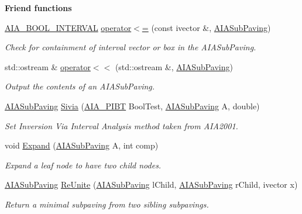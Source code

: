 \begin{Indent}{\bf \-Friend functions}
\begin{DoxyCompactItemize}
\hyperlink{AIAsubpaving_8hpp_a04a5da87f7c1570d6ef4843fb476d1a6}{\-A\-I\-A\-\_\-\-B\-O\-O\-L\-\_\-\-I\-N\-T\-E\-R\-V\-A\-L} \hyperlink{classAIASPnode_a0869804e6aaefcc26aebe081061df6ad}{operator$<$=} (const ivector \&, \hyperlink{AIAsubpaving_8hpp_ab6618d8727b32e897c1b7ab3415b93ff}{\-A\-I\-A\-Sub\-Paving})
\begin{DoxyCompactList}\small\item\em \-Check for containment of interval vector or box in the \-A\-I\-A\-Sub\-Paving. \end{DoxyCompactList}\item 
std\-::ostream \& \hyperlink{classAIASPnode_abf9101628f2ef58fbd1132a1c7086d06}{operator$<$$<$} (std\-::ostream \&, \hyperlink{AIAsubpaving_8hpp_ab6618d8727b32e897c1b7ab3415b93ff}{\-A\-I\-A\-Sub\-Paving})
\begin{DoxyCompactList}\small\item\em \-Output the contents of an \-A\-I\-A\-Sub\-Paving. \end{DoxyCompactList}\item 
\hyperlink{AIAsubpaving_8hpp_ab6618d8727b32e897c1b7ab3415b93ff}{\-A\-I\-A\-Sub\-Paving} \hyperlink{classAIASPnode_a7ca818aa239136500bfc1020684160de}{\-Sivia} (\hyperlink{AIAsubpaving_8hpp_ac3a2af016d66120f37b7e4b3da564876}{\-A\-I\-A\-\_\-\-P\-I\-B\-T} \-Bool\-Test, \hyperlink{AIAsubpaving_8hpp_ab6618d8727b32e897c1b7ab3415b93ff}{\-A\-I\-A\-Sub\-Paving} \-A, double)
\begin{DoxyCompactList}\small\item\em \-Set \-Inversion \-Via \-Interval \-Analysis method taken from \-A\-I\-A2001. \end{DoxyCompactList}\item 
void \hyperlink{classAIASPnode_aa3ceca06b6916b5ac1382a5aa8bf56aa}{\-Expand} (\hyperlink{AIAsubpaving_8hpp_ab6618d8727b32e897c1b7ab3415b93ff}{\-A\-I\-A\-Sub\-Paving} \-A, int comp)
\begin{DoxyCompactList}\small\item\em \-Expand a leaf node to have two child nodes. \end{DoxyCompactList}\item 
\hyperlink{AIAsubpaving_8hpp_ab6618d8727b32e897c1b7ab3415b93ff}{\-A\-I\-A\-Sub\-Paving} \hyperlink{classAIASPnode_ad0b3998c79d0cbf91d21c550a6bb72e7}{\-Re\-Unite} (\hyperlink{AIAsubpaving_8hpp_ab6618d8727b32e897c1b7ab3415b93ff}{\-A\-I\-A\-Sub\-Paving} l\-Child, \hyperlink{AIAsubpaving_8hpp_ab6618d8727b32e897c1b7ab3415b93ff}{\-A\-I\-A\-Sub\-Paving} r\-Child, ivector x)
\begin{DoxyCompactList}\small\item\em \-Return a minimal subpaving from two sibling subpavings. \end{DoxyCompactList}\item 

\end{DoxyCompactItemize}
\end{Indent}
